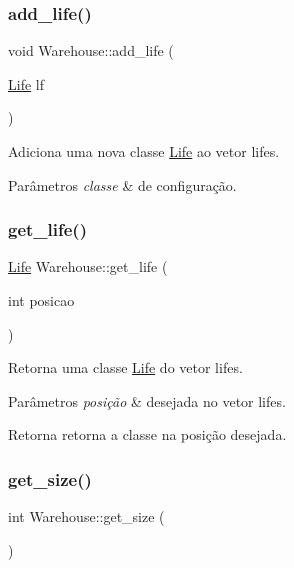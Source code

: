 \subsubsection{\texorpdfstring{add\+\_\+life()}{add\_life()}}
{\footnotesize\ttfamily void Warehouse\+::add\+\_\+life (\begin{DoxyParamCaption}\item[{\hyperlink{classLife}{Life}}]{lf }\end{DoxyParamCaption})\hspace{0.3cm}{\ttfamily [inline]}}

Adiciona uma nova classe \hyperlink{classLife}{Life} ao vetor lifes. 
\begin{DoxyParams}{Parâmetros}
{\em classe} & de configuração. \\
\hline
\end{DoxyParams}
\mbox{\label{classWarehouse_a390439a84e9be046eb97db2ef42ff378}} 
\subsubsection{\texorpdfstring{get\+\_\+life()}{get\_life()}}
{\footnotesize\ttfamily \hyperlink{classLife}{Life} Warehouse\+::get\+\_\+life (\begin{DoxyParamCaption}\item[{int}]{posicao }\end{DoxyParamCaption})\hspace{0.3cm}{\ttfamily [inline]}}

Retorna uma classe \hyperlink{classLife}{Life} do vetor lifes. 
\begin{DoxyParams}{Parâmetros}
{\em posição} & desejada no vetor lifes. \\
\hline
\end{DoxyParams}
\begin{DoxyReturn}{Retorna}
retorna a classe na posição desejada. 
\end{DoxyReturn}
\mbox{\label{classWarehouse_a1dde22e2b865dc1ab0b8d15f334322e6}} 
\subsubsection{\texorpdfstring{get\+\_\+size()}{get\_size()}}
{\footnotesize\ttfamily int Warehouse\+::get\+\_\+size (\begin{DoxyParamCaption}{ }\end{DoxyParamCaption})\hspace{0.3cm}{\ttfamily [inline]}}

